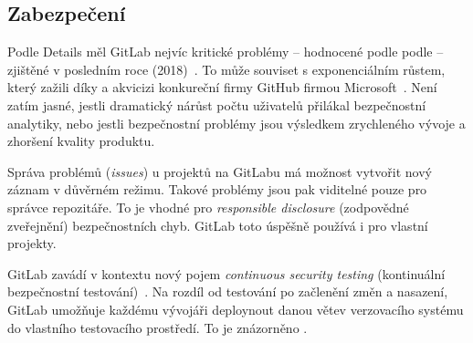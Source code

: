     \subsection{Zabezpečení}
        Podle  Details měl GitLab nejvíc kritické problémy -- hodnocené podle podle  -- zjištěné v posledním roce (2018)~\cite{cve-gitlab}. To může souviset s exponenciálním růstem, který zažili díky  a akvicizi konkureční firmy GitHub firmou Microsoft~\cite{gitlab-growth}. Není zatím jasné, jestli dramatický nárůst počtu uživatelů přilákal bezpečnostní analytiky, nebo jestli bezpečnostní problémy jsou výsledkem zrychleného vývoje a zhoršení kvality produktu.


        Správa problémů (\textit{issues}) u projektů na GitLabu má možnost vytvořit nový záznam v důvěrném režimu. Takové problémy jsou pak viditelné pouze pro správce repozitáře. To je vhodné pro \textit{responsible disclosure} (zodpovědné zveřejnění) bezpečnostních chyb. GitLab toto úspěšně používá i pro vlastní projekty.

        GitLab zavádí v kontextu \CICD nový pojem \textit{continuous security testing} (kontinuální bezpečnostní testování)~\cite{gitlab-app-security}. Na rozdíl od testování po začlenění změn a nasazení, GitLab umožňuje každému vývojáři deploynout danou větev verzovacího systému do vlastního testovacího prostředí. To je znázorněno .

